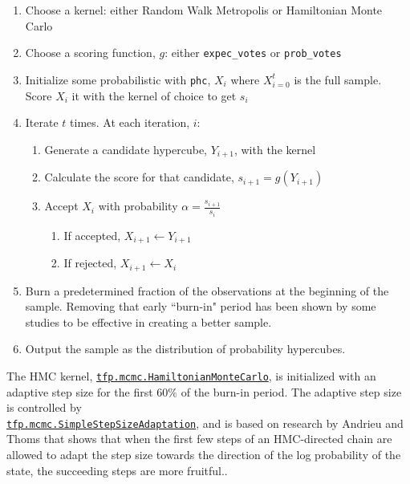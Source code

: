 \begin{enumerate}
  \item Choose a kernel: either Random Walk Metropolis or Hamiltonian Monte Carlo
  \item Choose a scoring function, $g$: either \texttt{expec\_votes} or \texttt{prob\_votes}
  \item Initialize some probabilistic with \texttt{phc}, $X_i$ where ${X}_{i=0}^t$ is the full sample. Score $X_i$ it with the kernel of choice to get $s_i$
  \item Iterate $t$ times. At each iteration, $i$:
  \begin{enumerate}[nolistsep]
    \item Generate a candidate hypercube, $Y_{i+1}$, with the kernel
    \item Calculate the score for that candidate, $s_{i+1} = g(Y_{i+1})$
    \item Accept $X_i$ with probability $\alpha = \frac{s_{i+1}}{s_i}$
    \begin{enumerate}[nolistsep]
      \item If accepted, $X_{i + 1} \leftarrow Y_{i + 1}$
      \item If rejected, $X_{i + 1} \leftarrow X_{i}$
    \end{enumerate}
  \end{enumerate}
  \item Burn a predetermined fraction of the observations at the beginning of the sample. Removing that early ``burn-in" period has been shown by some studies to be effective in creating a better sample.\cite{mcmc_methods}
  \item Output the sample as the distribution of probability hypercubes.
\end{enumerate}

The HMC kernel, \href{https://www.tensorflow.org/probability/api_docs/python/tfp/mcmc/HamiltonianMonteCarlo}{\texttt{tfp.mcmc.HamiltonianMonteCarlo}}, is initialized with an adaptive step size for the first $60\%$ of the burn-in period. The adaptive step size is controlled by \\\href{https://www.tensorflow.org/probability/api_docs/python/tfp/mcmc/SimpleStepSizeAdaptation}{\texttt{tfp.mcmc.SimpleStepSizeAdaptation}}, and is based on research by Andrieu and Thoms that shows that when the first few steps of an HMC-directed chain are allowed to adapt the step size towards the direction of the log probability of the state, the succeeding steps are more fruitful.\cite{hmc_adaptive}.

